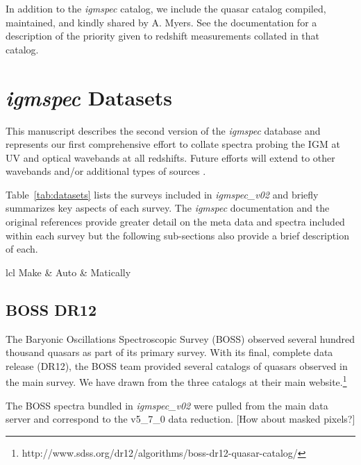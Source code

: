 \documentclass[12pt,preprint]{aastex}
\begin{document}
In addition to the {\it igmspec} catalog, we include the quasar
catalog compiled, maintained, and kindly shared by A. Myers.
See the documentation for a description of the priority given to 
redshift measurements collated in that catalog.


\section{{\it igmspec} Datasets}
\label{sec:datasets}

This manuscript describes the second version of the {\it igmspec}
database and represents our first comprehensive effort to collate
spectra probing the IGM at UV and optical wavebands at all
redshifts.  Future efforts will extend to other wavebands and/or
additional types of sources 
\citep[e.g. star-forming galaxies][]{rubin+14,rubin+16}.

Table~\ref{tab:datasets} lists the surveys included in
{\it igmspec\_v02} and briefly summarizes key aspects
of each survey.  The {\it igmspec} documentation and 
the original references provide greater detail on the meta data
and spectra included within each survey but the following
sub-sections also provide a brief description of each.

\begin{deluxetable}{lcl}
\tablewidth{0pc}
\tabletypesize{\scriptsize}
\startdata
Make & Auto & Matically \\
\enddata
\end{deluxetable}

\subsection{BOSS DR12}

The Baryonic Oscillations Spectroscopic Survey (BOSS)
observed several hundred thousand quasars as part of its
primary survey.  With its final, complete data release
(DR12), the BOSS team provided several catalogs of quasars
observed in the main survey.  We have drawn from the three
catalogs at their main website.\footnote{http://www.sdss.org/dr12/algorithms/boss-dr12-quasar-catalog/}


The BOSS spectra bundled in {\it igmspec\_v02} were pulled
from the main data server and correspond to the
v5\_7\_0 data reduction.
[How about masked pixels?]
\end{document}
